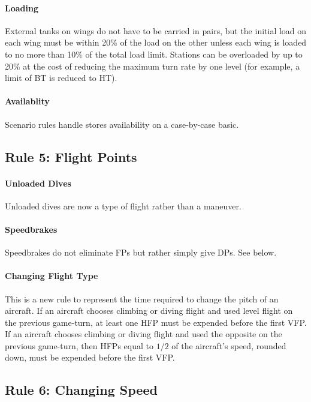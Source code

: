 \documentclass[10pt]{article}
\begin{document}
\paragraph{Loading} External tanks on wings do not have to be carried in pairs, but the initial load on each wing must be within 20\% of the load on the other unless each wing is loaded to no more than 10\% of the total load limit. Stations can be overloaded by up to 20\% at the cost of reducing the maximum turn rate by one level (for example, a limit of BT is reduced to HT).

\paragraph{Availablity} Scenario rules handle stores availability on a case-by-case basic.

\subsection{Rule 5: Flight Points}

\paragraph{Unloaded Dives} Unloaded dives are now a type of flight rather than a maneuver.

\paragraph{Speedbrakes} Speedbrakes do not eliminate FPs but rather simply give DPs. See below.

\paragraph{Changing Flight Type} This is a new rule to represent the time required to change the pitch of an aircraft. If an aircraft chooses climbing or diving flight and used level flight on the previous game-turn, at least one HFP must be expended before the first VFP. If an aircraft chooses climbing or diving flight and used the opposite on the previous game-turn, then HFPs equal to $1/2$ of the aircraft's speed, rounded down, must be expended before the first VFP. 

\subsection{Rule 6: Changing Speed}
\end{document}
